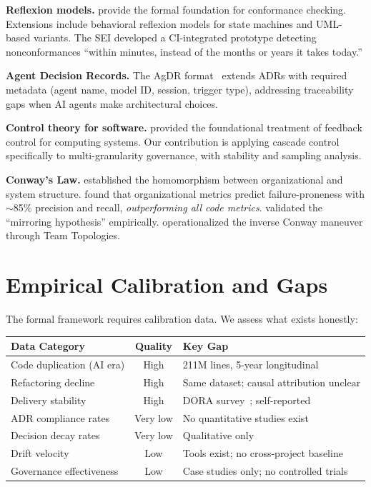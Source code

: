 \documentclass[11pt, a4paper, logo, copyright]{googledeepmind}
\begin{document}
\textbf{Reflexion models.} \citet{murphy1995, murphy2001} provide the formal foundation for conformance checking. Extensions include behavioral reflexion models for state machines and UML-based variants. The SEI developed a CI-integrated prototype detecting nonconformances ``within minutes, instead of the months or years it takes today.''

\textbf{Agent Decision Records.} The AgDR format~\citep{agdr} extends ADRs with required metadata (agent name, model ID, session, trigger type), addressing traceability gaps when AI agents make architectural choices.

\textbf{Control theory for software.} \citet{hellerstein2004} provided the foundational treatment of feedback control for computing systems. Our contribution is applying cascade control specifically to multi-granularity governance, with stability and sampling analysis.

\textbf{Conway's Law.} \citet{conway1968} established the homomorphism between organizational and system structure. \citet{nagappan2008} found that organizational metrics predict failure-proneness with $\sim$85\% precision and recall, \emph{outperforming all code metrics}. \citet{maccormack2008} validated the ``mirroring hypothesis'' empirically. \citet{skelton2019} operationalized the inverse Conway maneuver through Team Topologies.


\section{Empirical Calibration and Gaps}
\label{sec:gaps}

The formal framework requires calibration data. We assess what exists honestly:

\begin{center}
\begin{tabular}{lcp{6cm}}
\toprule
Data Category & Quality & Key Gap \\
\midrule
Code duplication (AI era) & High & 211M lines, 5-year longitudinal~\citep{gitclear2025} \\
Refactoring decline & High & Same dataset; causal attribution unclear \\
Delivery stability & High & DORA survey~\citep{dora2025}; self-reported \\
ADR compliance rates & Very low & No quantitative studies exist \\
Decision decay rates & Very low & Qualitative only \\
Drift velocity & Low & Tools exist; no cross-project baseline \\
Governance effectiveness & Low & Case studies only; no controlled trials \\
\bottomrule
\end{tabular}
\end{center}
\end{document}
